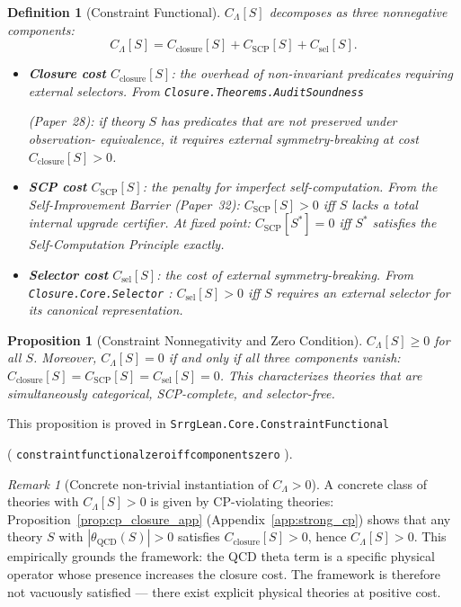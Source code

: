 \documentclass[11pt]{article}
\newtheorem{proposition}[theorem]{Proposition}
\newtheorem{definition}[theorem]{Definition}
\theoremstyle{remark}
\newtheorem{remark}[theorem]{Remark}
\newcommand{\lean}[1]{%
  \penalty-100
  \begingroup
  \def\_{\textunderscore\allowbreak}%
  \texttt{#1}%
  \endgroup
}
\newcommand{\Sstar}{S^*}
\begin{document}
\begin{definition}[Constraint Functional]
\label{def:constraint}
$C_\Lambda[S]$ decomposes as three nonnegative components:
\begin{equation}
C_\Lambda[S] = C_{\text{closure}}[S] + C_{\text{SCP}}[S] + C_{\text{sel}}[S].
\end{equation}

\begin{itemize}[leftmargin=2.5em]
\item \textbf{Closure cost} $C_{\text{closure}}[S]$: the overhead of non-invariant
  predicates requiring external selectors. From \lean{Closure.Theorems.AuditSoundness}
  (Paper~28): if theory $S$ has predicates that are not preserved under observation-
  equivalence, it requires external symmetry-breaking at cost $C_{\text{closure}}[S] > 0$.

\item \textbf{SCP cost} $C_{\text{SCP}}[S]$: the penalty for imperfect
  self-computation. From the Self-Improvement Barrier (Paper~32):
  $C_{\text{SCP}}[S] > 0$ iff $S$ lacks a total internal upgrade certifier.
  At fixed point: $C_{\text{SCP}}[\Sstar] = 0$ iff $\Sstar$ satisfies the
  Self-Computation Principle exactly.

\item \textbf{Selector cost} $C_{\text{sel}}[S]$: the cost of external
  symmetry-breaking. From \lean{Closure.Core.Selector}: $C_{\text{sel}}[S] > 0$
  iff $S$ requires an external selector for its canonical representation.
\end{itemize}
\end{definition}

\begin{proposition}[Constraint Nonnegativity and Zero Condition]
\label{prop:constraint_zero}
$C_\Lambda[S] \geq 0$ for all $S$. Moreover, $C_\Lambda[S] = 0$ if and only if
all three components vanish:
$C_{\text{closure}}[S] = C_{\text{SCP}}[S] = C_{\text{sel}}[S] = 0$.
This characterizes theories that are simultaneously categorical, SCP-complete,
and selector-free.
\end{proposition}

This proposition is proved in \lean{SrrgLean.Core.ConstraintFunctional}
(\lean{constraint\_functional\_zero\_iff\_components\_zero}).

\begin{remark}[Concrete non-trivial instantiation of $C_\Lambda > 0$]
A concrete class of theories with $C_\Lambda[S] > 0$ is given by CP-violating
theories: Proposition~\ref{prop:cp_closure_app} (Appendix~\ref{app:strong_cp}) shows
that any theory $S$ with $|\theta_{\mathrm{QCD}}(S)| > 0$ satisfies
$C_{\mathrm{closure}}[S] > 0$, hence $C_\Lambda[S] > 0$.  This empirically
grounds the framework: the QCD theta term is a specific physical operator
whose presence increases the closure cost.  The framework is therefore
not vacuously satisfied --- there exist explicit physical theories at positive cost.
\end{remark}
\end{document}
